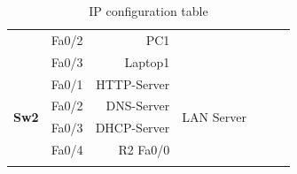 \documentclass[11pt,a4paper]{report}
\begin{document}
\begin{longtable}[c]{@{}llrllrr@{}}
                                                           & Fa0/2                        & PC1                       &                                                       & \multicolumn{3}{c}{}                                                                                                                                                 \\
                                                           & Fa0/3                        & Laptop1                   &                                                       & \multicolumn{3}{c}{}                                                                                                                                                 \\* \midrule
        \multirow{4}{*}{\textbf{Sw2}}                      & Fa0/1                        & HTTP-Server               & \multirow{4}{*}{LAN Server}                           & \multicolumn{3}{c}{\multirow{4}{*}{}}                                                                                                                                \\
                                                           & Fa0/2                        & DNS-Server                &                                                       & \multicolumn{3}{c}{}                                                                                                                                                 \\
                                                           & Fa0/3                        & DHCP-Server               &                                                       & \multicolumn{3}{c}{}                                                                                                                                                 \\
                                                           & Fa0/4                        & R2 Fa0/0                  &                                                       & \multicolumn{3}{c}{}                                                                                                                                                 \\* \bottomrule
        \caption{IP configuration table}
        \label{tab:ipconftable}\\
    \end{longtable}
\end{document}
